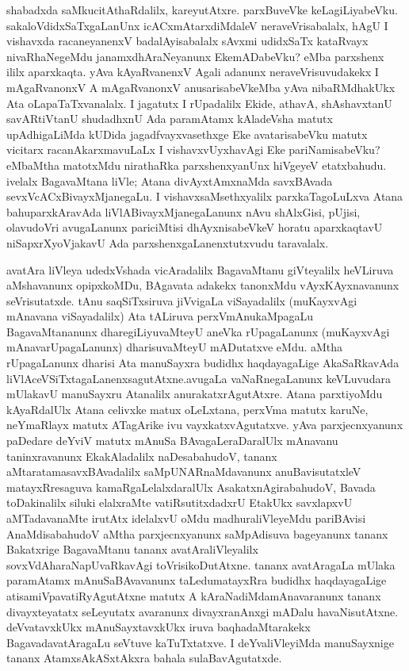 shabadxda saMkucitAthaRdalilx, kareyutAtxre. parxBuveVke keLagiLiyabeVku. sakaloVdidxSaTxgaLanUnx icACx\-mAtarxdiMdaleV neraveVrisabalalx, hAgU I vishavxda racaneyanenxV badalAyisabalalx sAvxmi udidxSaTx kataRvayx nivaRhaNegeMdu janamxdhAraNeyanunx EkemADabeVku? eMba parxshenx ililx aparxkaqta. yAva kAyaRvanenxV Agali adanunx neraveVrisuvudakekx I mAgaRvanonxV A mAgaRvanonxV anusarisabeVkeMba yAva nibaRMdhakUkx Ata oLapaTaTxvanalalx. I jagatutx I rUpadalilx Ekide, athavA, shAshavxtanU savARtiVtanU shudadhxnU Ada paramAtamx kAla\break deVsha matutx upAdhigaLiMda kUDida jagadfvayxvasethxge Eke avatarisabeVku matutx \hbox{vicitarx} racanAkarxmavuLaLx I vishavxvUyxhavAgi Eke pariNamisabeVku? eMbaMtha matotxMdu nira\-thaRka parxshenxyanUnx hiVgeyeV etatxbahudu. ivelalx BagavaMtana liVle; Atana divAyxtAmx\-naMda savxBAvada sevxVcACxBivayxMjanegaLu. I vishavxsaMsethxyalilx parxkaTagoLuLxva Atana bahu\-parxkAravAda liVlABivayxMjanegaLanunx nAvu shAlxGisi, pUjisi, olavudoVri avu\-gaLanunx pariciMtisi dhAyxnisabeVkeV horatu aparxkaqtavU niSapxrXyoVjakavU Ada parxshenxgaLanenxtutxvudu taravalalx.

avatAra liVleya udedxVshada vicAradalilx BagavaMtanu giVteyalilx heVLiruva aMsha\-vanunx opipxkoMDu, BAgavata adakekx tanonxMdu vAyxKAyxnavanunx seVrisutatxde. tAnu saqSiTxsiruva jiVvigaLa viSayadalilx (muKayxvAgi mAnavana viSayadalilx) Ata tALiruva perxVmAnukaMpagaLu BagavaMtananunx dharegiLiyuvaMteyU aneVka rUpagaLanunx (muKayxvAgi mAnavarUpagaLanunx) dharisuvaMteyU mADutatxve eMdu. aMtha rUpagaLanunx dharisi Ata manuSayxra budidhx haqdayagaLige AkaSaRkavAda liVlAceVSiTxtagaLanenxsagutAtxne.\break avugaLa vaNaRnegaLanunx keVLuvudara mUlakavU manuSayxru Atanalilx anurakatxrAgu\-tAtxre. Atana parxtiyoMdu kAyaRdalUlx Atana celivxke matux oLeLxtana, perxVma matutx karuNe, neYmaRlayx matutx ATagArike ivu vayxkatxvAgutatxve. yAva parxjecnxyanunx paDedare deYviV matutx mAnuSa BAvagaLeraDaralUlx mAnavanu taninxravanunx EkakAladalilx naDesa\-bahudoV, tananx aMtaratamasavxBAvadalilx saMpUNARnaMdavanunx anuBavisutatxleV matayxRresaguva kamaRgaLelalxdaralUlx AsakatxnAgirabahudoV, Bavada toDakinalilx siluki elalxraMte vatiRsutitxdadxrU EtakUkx savxlapxvU aMTadavanaMte irutAtx idelalxvU oMdu madhura\-liVleyeMdu pariBAvisi AnaMdisabahudoV aMtha parxjecnxyanunx saMpAdisuva bage\-yanunx tananx Bakatxrige BagavaMtanu tananx avatAraliVleyalilx sovxVdAharaNapUvaRkavAgi toVrisikoDutAtxne. tananx avatAragaLa mUlaka paramAtamx mAnuSaBAvavanunx taLedu\break matayxRra budidhx haqdayagaLige atisamiVpavatiRyAgutAtxne matutx A kAraNadiMda\break mAnavaranunx tananx divayxteyatatx seLeyutatx avaranunx divayxranAnxgi mADalu havaNisu\-tAtxne. deVvatavxkUkx mAnuSayxtavxkUkx iruva baqhadaMtarakekx BagavadavatAragaLu seVtuve kaTuTxtatxve. I deYvaliVleyiMda manuSayxnige tananx AtamxsAkASxtAkxra bahala sulaBavAgutatxde.

